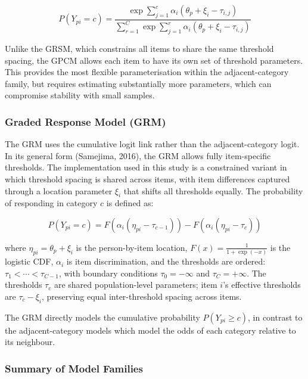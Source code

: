 \documentclass[
  man,
  floatsintext,
  longtable,
  nolmodern,
  notxfonts,
  notimes,
  colorlinks=true,linkcolor=blue,citecolor=blue,urlcolor=blue]{apa7}
\begin{document}
\[
P(Y_{pi} = c) = \frac{\exp \sum_{j=1}^{c} \alpha_i(\theta_p + \xi_i - \tau_{i,j})}{\sum_{r=1}^{C} \exp \sum_{j=1}^{r} \alpha_i(\theta_p + \xi_i - \tau_{i,j})}
\]

Unlike the GRSM, which constrains all items to share the same threshold
spacing, the GPCM allows each item to have its own set of threshold
parameters. This provides the most flexible parameterisation within the
adjacent-category family, but requires estimating substantially more
parameters, which can compromise stability with small samples.

\subsubsection{Graded Response Model
(GRM)}\label{graded-response-model-grm}

The GRM uses the cumulative logit link rather than the adjacent-category
logit. In its general form (Samejima, 2016), the GRM allows fully
item-specific thresholds. The implementation used in this study is a
constrained variant in which threshold spacing is shared across items,
with item differences captured through a location parameter \(\xi_i\)
that shifts all thresholds equally. The probability of responding in
category \(c\) is defined as:

\[
P(Y_{pi} = c) = F\!\left(\alpha_i(\eta_{pi} - \tau_{c-1})\right) - F\!\left(\alpha_i(\eta_{pi} - \tau_c)\right)
\]

where \(\eta_{pi} = \theta_p + \xi_i\) is the person-by-item location,
\(F(x) = \frac{1}{1 + \exp(-x)}\) is the logistic CDF, \(\alpha_i\) is
item discrimination, and the thresholds are ordered:
\(\tau_1 < \cdots < \tau_{C-1}\), with boundary conditions
\(\tau_0 = -\infty\) and \(\tau_C = +\infty\). The thresholds \(\tau_c\)
are shared population-level parameters; item \(i\)'s effective
thresholds are \(\tau_c - \xi_i\), preserving equal inter-threshold
spacing across items.

The GRM directly models the cumulative probability \(P(Y_{pi} \geq c)\),
in contrast to the adjacent-category models which model the odds of each
category relative to its neighbour.

\subsubsection{Summary of Model
Families}\label{summary-of-model-families}

\fontsize{10.5pt}{12.6pt}\selectfont
\end{document}
